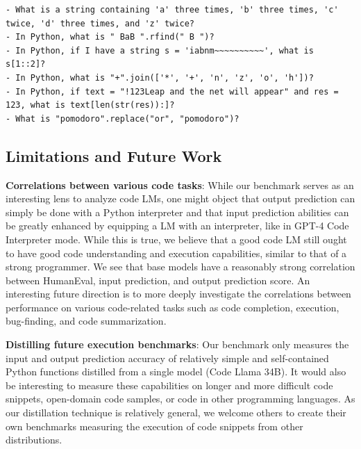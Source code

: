 \begin{lstlisting}
- What is a string containing 'a' three times, 'b' three times, 'c' twice, 'd' three times, and 'z' twice?
- In Python, what is " BaB ".rfind(" B ")?
- In Python, if I have a string s = 'iabnm~~~~~~~~~~', what is s[1::2]?
- In Python, what is "+".join(['*', '+', 'n', 'z', 'o', 'h'])?
- In Python, if text = "!123Leap and the net will appear" and res = 123, what is text[len(str(res)):]?
- What is "pomodoro".replace("or", "pomodoro")?
\end{lstlisting}




\subsection{Limitations and Future Work} \label{sec:limitations-future-work}

\textbf{Correlations between various code tasks}: While our benchmark serves as an interesting lens to analyze code LMs, one might object that output prediction can simply be done with a Python interpreter and that input prediction abilities can be greatly enhanced by equipping a LM with an interpreter, like in GPT-4 Code Interpreter mode. While this is true, we believe that a good code LM still ought to have good code understanding and execution capabilities, similar to that of a strong programmer. We see that base models have a reasonably strong correlation between HumanEval, input prediction, and output prediction score. An interesting future direction is to more deeply investigate the correlations between performance on various code-related tasks such as code completion, execution, bug-finding, and code summarization.

\textbf{Distilling future execution benchmarks}: Our benchmark only measures the input and output prediction accuracy of relatively simple and self-contained Python functions distilled from a single model (Code Llama 34B). It would also be interesting to measure these capabilities on longer and more difficult code snippets, open-domain code samples, or code in other programming languages. As our distillation technique is relatively general, we welcome others to create their own benchmarks measuring the execution of code snippets from other distributions.

